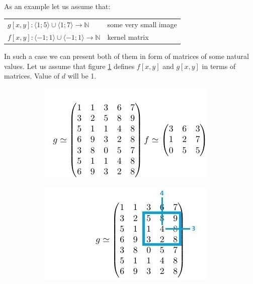 \documentclass{article}
\makeatletter
\newenvironment{conditions}
  {\par\vspace{\abovedisplayskip}\noindent\begin{tabular}{>{$}l<{$} @{${}\equiv{}$} l}}
  {\end{tabular}\par\vspace{\belowdisplayskip}}
\makeatother
\begin{document}
\begin{description}
As an example let us assume that:
\begin{conditions} 
  g[x,y] : \langle 1; 5 \rangle \cup \langle 1 ; 7 \rangle \rightarrow \mathbb{N} & some very small image\\
  f[x,y] : \langle -1; 1 \rangle \cup \langle -1 ; 1 \rangle \rightarrow \mathbb{N} & kernel matrix \\
\end{conditions}

In such a case we can present both of them in form of matrices of some natural values. Let us assume that figure \ref{fig:example_repr} defines $f[x,y]$ and $g[x,y]$ in terms of matrices. Value of $d$ will be 1.
\begin{figure}[H]
\centering
\begin{subfigure}{.4\textwidth}
  \centering
  \includegraphics[width=0.95\linewidth]{_Figures/example_11.jpg}
  \caption{}
  \label{fig:example_repr}
\end{subfigure}%
\begin{subfigure}{.4\textwidth}
  \centering
  \includegraphics[width=0.95\linewidth]{_Figures/example_12.jpg}
  \caption{}
  \label{fig:example_43}
\end{subfigure}%
\caption{}
\label{fig:results_tresh}
\end{figure}


\end{description}
\end{document}
